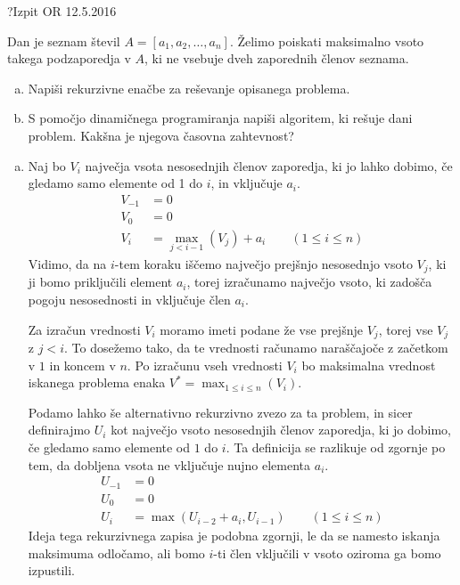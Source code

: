 \begin{naloga}{?}{Izpit OR 12.5.2016}
\begin{vprasanje}
Dan je seznam števil $A = [a_1, a_2, \dots, a_n]$.
Želimo poiskati maksimalno vsoto takega podzaporedja v $A$,
ki ne vsebuje dveh zaporednih členov seznama.

\begin{enumerate}[(a)]
\item Napiši rekurzivne enačbe za reševanje opisanega problema.

\item S pomočjo dinamičnega programiranja napiši algoritem,
ki rešuje dani problem.
Kakšna je njegova časovna zahtevnost?
\end{enumerate}
\end{vprasanje}
\begin{odgovor}

\begin{enumerate}[(a)]

\item Naj bo $V_i$ največja vsota nesosednjih členov zaporedja, ki jo lahko dobimo,
če gledamo samo elemente od 1 do $i$, in vključuje $a_i$.
\begin{align*}
V_{-1} &= 0 \\
V_0 &= 0 \\
V_i &= \max_{j < i - 1}\left(V_j\right) + a_i
\qquad (1 \le i \le n)
\end{align*}
Vidimo, da na $i$-tem koraku iščemo največjo prejšnjo nesosednjo vsoto $V_j$,
ki ji bomo priključili element $a_i$, torej izračunamo največjo vsoto,
ki zadošča pogoju nesosednosti in vključuje člen $a_i$.

Za izračun vrednosti $V_i$ moramo imeti podane že vse prejšnje $V_j$,
torej vse $V_j$ z $j < i$.
To dosežemo tako, da te vrednosti računamo naraščajoče z začetkom v $1$ in koncem v $n$.
Po izračunu vseh vrednosti $V_i$ bo maksimalna vrednost iskanega problema
enaka $V^* = \max_{1 \leq i \leq n}(V_i)$.

Podamo lahko še alternativno rekurzivno zvezo za ta problem, in sicer
definirajmo $U_i$ kot največjo vsoto nesosednjih členov zaporedja,
ki jo dobimo, če gledamo samo elemente od $1$ do $i$.
Ta definicija se razlikuje od zgornje po tem, da dobljena vsota ne vključuje nujno elementa $a_i$.
\begin{align*}
U_{-1} &= 0 \\
U_0 &= 0 \\
U_i &= \max\left(U_{i - 2} + a_i, U_{i - 1}\right)
\qquad (1 \le i \le n)
\end{align*}
Ideja tega rekurzivnega zapisa je podobna zgornji,
le da se namesto iska\-nja maksimuma odločamo,
ali bomo $i$-ti člen vključili v vsoto oziroma ga bomo izpustili.


\end{enumerate}
\end{odgovor}
\end{naloga}
